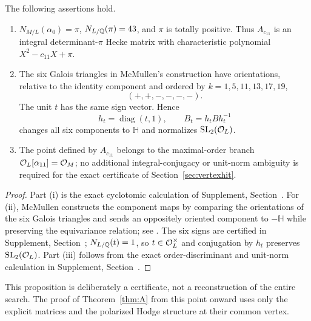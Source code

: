 \begin{proposition}\label{prop:mainarith}
The following assertions hold.
\begin{enumerate}[label=(\roman*)]
\item $N_{M/L}(\alpha_0)=\pi$, $N_{L/\mathbb Q}(\pi)=43$, and $\pi$ is totally positive.  Thus $A_{c_{11}}$ is an integral determinant-$\pi$ Hecke matrix with characteristic polynomial $X^2-c_{11}X+\pi$.
\item The six Galois triangles in McMullen's construction have orientations, relative to the identity component and ordered by $k=1,5,11,13,17,19$,
\[
 (+,+,-,-,-,-).
\]
The unit $t$ has the same sign vector.  Hence
\[
 h_t=\operatorname{diag}(t,1),\qquad B_t=h_tBh_t^{-1}
\]
changes all six components to $\mathbb H$ and normalizes $\mathrm{SL}_2(\mathcal O_L)$.
\item The point defined by $A_{c_{11}}$ belongs to the maximal-order branch $\mathcal O_L[\alpha_{11}]=\mathcal O_M$; no additional integral-conjugacy or unit-norm ambiguity is required for the exact certificate of Section~\ref{sec:vertexhit}.
\end{enumerate}
\end{proposition}
\begin{proof}
Part (i) is the exact cyclotomic calculation of Supplement, Section~.  For (ii), McMullen constructs the component maps by comparing the orientations of the six Galois triangles and sends an oppositely oriented component to $-\mathbb H$ while preserving the equivariance relation; see \cite[Prop.~6.1, Cor.~6.2, Thm.~6.3 and Eq.~(6.1)]{McMullen2026}.  The six signs are certified in Supplement, Section~; $N_{L/\mathbb Q}(t)=1$, so $t\in\mathcal O_L^\times$ and conjugation by $h_t$ preserves $\mathrm{SL}_2(\mathcal O_L)$.  Part (iii) follows from the exact order-discriminant and unit-norm calculation in Supplement, Section~.
\end{proof}

This proposition is deliberately a certificate, not a reconstruction of the entire search.  The proof of Theorem~\ref{thm:A} from this point onward uses only the explicit matrices and the polarized Hodge structure at their common vertex.

